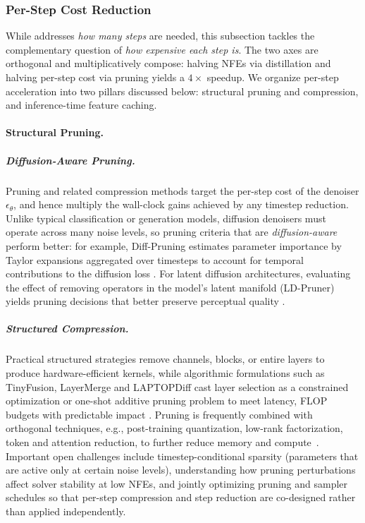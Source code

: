 \documentclass{llmxive}
\begin{document}
\subsubsection{Per-Step Cost Reduction}
\label{subsec:efficiency}

{While  addresses \emph{how many steps} are needed, this subsection tackles the complementary question of \emph{how expensive each step is}. The two axes are orthogonal and multiplicatively compose: halving NFEs via distillation and halving per-step cost via pruning yields a $4\times$ speedup. We organize per-step acceleration into two pillars discussed below: structural pruning and compression, and inference-time feature caching.}

\paragraph{Structural Pruning.}
\label{subsubsec:pruning}

\subparagraph{Diffusion-Aware Pruning.}
Pruning and related compression methods target the per-step cost of the denoiser $\epsilon_\theta$, and hence multiply the wall-clock gains achieved by any timestep reduction. Unlike typical classification or generation models, diffusion denoisers must operate across many noise levels, so pruning criteria that are \emph{diffusion-aware} perform better: for example, Diff-Pruning estimates parameter importance by Taylor expansions aggregated over timesteps to account for temporal contributions to the diffusion loss \citep{fang2023structural}. For latent diffusion architectures, evaluating the effect of removing operators in the model's latent manifold (LD-Pruner) yields pruning decisions that better preserve perceptual quality \citep{castells2024ld}.

\subparagraph{Structured Compression.}
Practical structured strategies remove channels, blocks, or entire layers to produce hardware-efficient kernels, while algorithmic formulations such as TinyFusion, LayerMerge and LAPTOPDiff cast layer selection as a constrained optimization or one-shot additive pruning problem to meet latency, FLOP budgets with predictable impact \citep{fang2025tinyfusion, kim2024layermerge,zhang2024laptop}. Pruning is frequently combined with orthogonal techniques, e.g., post-training quantization, low-rank factorization, token and attention reduction, to further reduce memory and compute~\citep{10377259,shang2023post,kim2025ditto,bolya2023tomesd,kim2024tofu,yuan2024ditfastattn}. Important open challenges include timestep-conditional sparsity (parameters that are active only at certain noise levels), understanding how pruning perturbations affect solver stability at low NFEs, and jointly optimizing pruning and sampler schedules so that per-step compression and step reduction are co-designed rather than applied independently.
\end{document}
